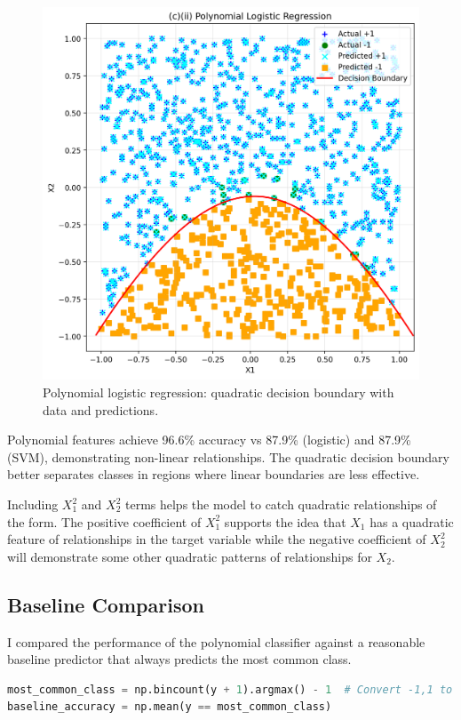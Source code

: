 \documentclass[12pt,a4paper]{article}
\begin{document}
\begin{figure}[H]
    \centering
    \includegraphics[width=0.7\linewidth]{poly_boundary.png}
    \caption{Polynomial logistic regression: quadratic decision boundary with data and predictions.}
    \label{fig:poly_boundary}
\end{figure}

Polynomial features achieve 96.6\% accuracy vs 87.9\% (logistic) and 87.9\% (SVM), demonstrating non-linear relationships. The quadratic decision boundary better separates classes in regions where linear boundaries are less effective.

Including $X_1^2$ and $X_2^2$ terms helps the model to catch quadratic relationships of the form. The positive coefficient of $X_1^2$ supports the idea that $X_1$ has a quadratic feature of relationships in the target variable while the negative coefficient of $X_2^2$ will demonstrate some other quadratic patterns of relationships for $X_2$.

\subsection{Baseline Comparison}

I compared the performance of the polynomial classifier against a reasonable baseline predictor that always predicts the most common class.

\begin{lstlisting}[language=Python, caption={Baseline comparison}]
most_common_class = np.bincount(y + 1).argmax() - 1  # Convert -1,1 to 0,2 then back
baseline_accuracy = np.mean(y == most_common_class)
\end{lstlisting}
\end{document}
